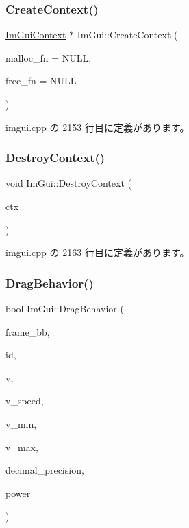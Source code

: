 \subsubsection{\texorpdfstring{Create\+Context()}{CreateContext()}}
{\footnotesize\ttfamily \mbox{\hyperlink{struct_im_gui_context}{Im\+Gui\+Context}} $\ast$ Im\+Gui\+::\+Create\+Context (\begin{DoxyParamCaption}\item[{void $\ast$($\ast$)(size\+\_\+t)}]{malloc\+\_\+fn = {\ttfamily NULL},  }\item[{void($\ast$)(void $\ast$)}]{free\+\_\+fn = {\ttfamily NULL} }\end{DoxyParamCaption})}



 imgui.\+cpp の 2153 行目に定義があります。

\mbox{\label{namespace_im_gui_a344adba8bd84069dc7425b88306411c7}} 
\subsubsection{\texorpdfstring{Destroy\+Context()}{DestroyContext()}}
{\footnotesize\ttfamily void Im\+Gui\+::\+Destroy\+Context (\begin{DoxyParamCaption}\item[{\mbox{\hyperlink{struct_im_gui_context}{Im\+Gui\+Context}} $\ast$}]{ctx }\end{DoxyParamCaption})}



 imgui.\+cpp の 2163 行目に定義があります。

\mbox{\label{namespace_im_gui_a4fdcba60dbe3762a144051add234ea48}} 
\subsubsection{\texorpdfstring{Drag\+Behavior()}{DragBehavior()}}
{\footnotesize\ttfamily bool Im\+Gui\+::\+Drag\+Behavior (\begin{DoxyParamCaption}\item[{const \mbox{\hyperlink{struct_im_rect}{Im\+Rect}} \&}]{frame\+\_\+bb,  }\item[{\mbox{\hyperlink{imgui_8h_a1785c9b6f4e16406764a85f32582236f}{Im\+Gui\+ID}}}]{id,  }\item[{float $\ast$}]{v,  }\item[{float}]{v\+\_\+speed,  }\item[{float}]{v\+\_\+min,  }\item[{float}]{v\+\_\+max,  }\item[{int}]{decimal\+\_\+precision,  }\item[{float}]{power }\end{DoxyParamCaption})}



